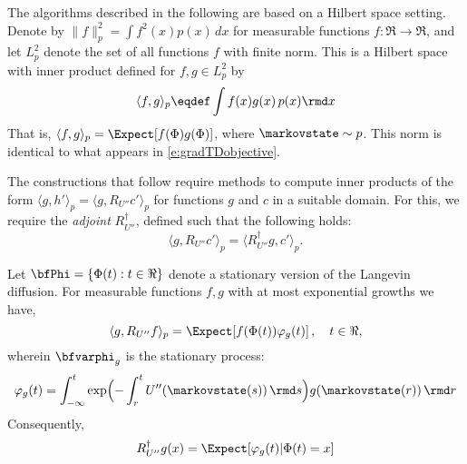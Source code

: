 The algorithms described in the following are based on a Hilbert space setting.   Denote by $\|f\|_p^{2} = \int f^2(x) p(x)\, dx$ for measurable functions $f\colon\Re\to\Re$, and let $L_p^2$ denote the set of all functions $f$
with finite norm.   This is a Hilbert space with inner product defined for $f,g\in L_p^2$ by
\begin{equation*}
\langle f,g \rangle_p \eqdef \int f(x)g(x)\, p(x)\rmd x
\end{equation*}
That is, $\langle f,g \rangle_p = \Expect[f(\Phi)g(\Phi)]$, where $\markovstate\sim p$.   This norm is identical to what appears in  \eqref{e:gradTDobjective}.    


The constructions that follow require methods to compute inner products of the form $\langle g, h' \rangle_p = \langle g, R_{U''} c'\rangle_p $ for functions $g$ and $c$ in a  suitable domain.   For this, we require the \textit{adjoint} $R_{U''}^\dagger$, defined such that the following holds:
$$\langle g, R_{U''} c'\rangle_p = \langle R_{U''}^\dagger g, c'\rangle_p. $$

\begin{lemma}
	\label{t:adjointRG}
	Let $\bfPhi=\{\Phi(t) : t\in\Re\}$ denote a stationary version of the Langevin diffusion.
	For measurable functions $f,g$ with at most exponential growths we have,
	\begin{equation}
	\langle g, R_{U''} f \rangle_p   = \Expect [ f(\Phi(t))	\varphi_g(t)   ]\,, \quad t\in\Re,
	\label{e:t:adjointRG}
	\end{equation}
	wherein $\bfvarphi_g$ is the stationary process:
	\begin{equation}
	\varphi_g(t)
	=
	\int_{-\infty}^t  \exp\Bigl(-\int_r^t {U''}(\markovstate(s))\, \rmd s  \Bigr) g(\markovstate(r))   \,  \rmd r
	\label{eq_eligibility_vec}
	\end{equation}
	Consequently, 
	\[
	R_{U''}^\dagger g(x) = \Expect [\varphi_g(t)|\Phi(t)=x]
	\]
\end{lemma}

